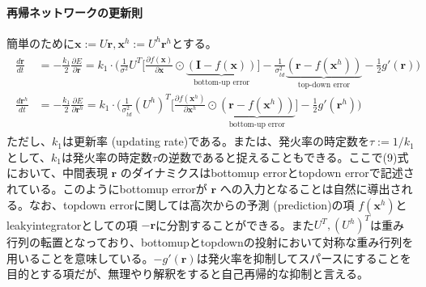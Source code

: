 \documentclass[letterpaper,10pt,english]{sphinxmanual}
\begin{document}
\paragraph{再帰ネットワークの更新則}
\label{\detokenize{11-3_predictive-coding-rao:id4}}
簡単のために\(\boldsymbol{x}:=U\boldsymbol{r}, \boldsymbol{x}^h:=U^h\boldsymbol{r}^h\)とする。
\begin{equation*}
\begin{split}
\begin{align}
\frac{d \boldsymbol{r}}{d t}&=-\frac{k_{1}}{2} \frac{\partial E}{\partial \boldsymbol{r}}=k_{1}\cdot\Bigg(\frac{1}{\sigma^{2}} U^{T}\bigg[\frac{\partial f(\boldsymbol{x})}{\partial \boldsymbol{x}}\odot\underbrace{(\boldsymbol{I}-f(\boldsymbol{x}))}_{\text{bottom-up error}}\bigg]-\frac{1}{\sigma_{t d}^{2}}\underbrace{\left(\boldsymbol{r}-f(\boldsymbol{x}^h)\right)}_{\text{top-down error}}-\frac{1}{2}g'(\boldsymbol{r})\Bigg)\tag{9}\\
\frac{d \boldsymbol{r}^h}{d t}&=-\frac{k_{1}}{2} \frac{\partial E}{\partial \boldsymbol{r}^h}=k_{1}\cdot\Bigg(\frac{1}{\sigma_{t d}^{2}}(U^h)^T\bigg[\frac{\partial f(\boldsymbol{x}^h)}{\partial \boldsymbol{x}^h}\odot\underbrace{\left(\boldsymbol{r}-f(\boldsymbol{x}^h)\right)}_{\text{bottom-up error}}\bigg]-\frac{1}{2}g'(\boldsymbol{r}^h)\Bigg)\tag{10}
\end{align}
\end{split}
\end{equation*}
ただし、\(k_1\)は更新率 (updating rate)である。または、発火率の時定数を\(\tau:=1/k_1\)として、\(k_1\)は発火率の時定数\(\tau\)の逆数であると捉えることもできる。ここで(9)式において、中間表現 \(\boldsymbol{r}\) のダイナミクスはbottom\sphinxhyphen{}up errorとtop\sphinxhyphen{}down errorで記述されている。このようにbottom\sphinxhyphen{}up errorが \(\boldsymbol{r}\) への入力となることは自然に導出される。なお、top\sphinxhyphen{}down errorに関しては高次からの予測 (prediction)の項 \(f(\boldsymbol{x}^h)\)とleaky\sphinxhyphen{}integratorとしての項 \(-\boldsymbol{r}\)に分割することができる。また\(U^T, (U^h)^T\)は重み行列の転置となっており、bottom\sphinxhyphen{}upとtop\sphinxhyphen{}downの投射において対称な重み行列を用いることを意味している。\(-g'(\boldsymbol{r})\)は発火率を抑制してスパースにすることを目的とする項だが、無理やり解釈をすると自己再帰的な抑制と言える。

\begin{sphinxVerbatim}[commandchars=\\\{\}]
 
\end{sphinxVerbatim}
\end{document}
